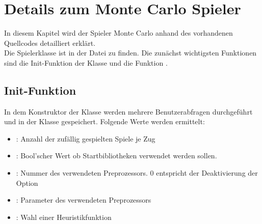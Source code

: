 \section{Details zum Monte Carlo Spieler}
In diesem Kapitel wird der Spieler Monte Carlo anhand des vorhandenen Quellcodes detailliert erklärt.
\\Die Spielerklasse  ist in der Datei  zu finden.
Die zunächst wichtigsten Funktionen sind die Init-Funktion der Klasse und die Funktion .
\subsection*{Init-Funktion}
In dem Konstruktor der Klasse  werden mehrere Benutzerabfragen durchgeführt und in der Klasse gespeichert. Folgende Werte werden ermittelt:
\begin{itemize}
\item {}: Anzahl der zufällig gespielten Spiele je Zug
\item {}: Bool'scher Wert ob Startbibliotheken verwendet werden sollen.
\item {}: Nummer des verwendeten Preprozessors. 0 entspricht der Deaktivierung der Option
\item {}: Parameter des verwendeten Preprozessors
\item {}: Wahl einer Heuristikfunktion
\end{itemize}

